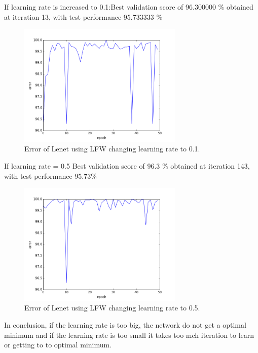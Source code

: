 If learning rate is increased to 0.1:Best validation score of 96.300000 \% obtained at iteration 13, with test performance 95.733333 \%\\

\begin{figure}[htb]
\centering
\includegraphics[width=0.7\textwidth]{images/LFW_learningrate/error_0_1.png}
\caption{Error of Lenet using LFW changing learning rate to 0.1.} \label{fig:LENETLFW_lr0_1}
\end{figure}

If learning rate = 0.5 Best validation score of 96.3 \% obtained at iteration 143, with test performance 95.73\% \\

\begin{figure}[htb]
\centering
\includegraphics[width=0.7\textwidth]{images/LFW_learningrate/error_0_5.png}
\caption{Error of Lenet using LFW changing learning rate to 0.5.} \label{fig:LENETLFW_lr0_5}
\end{figure}

In conclusion, if the learning rate is too big, the network do not get a optimal minimum and if the learning rate is too small it takes too mch iteration to learn or getting to to optimal minimum.\\


